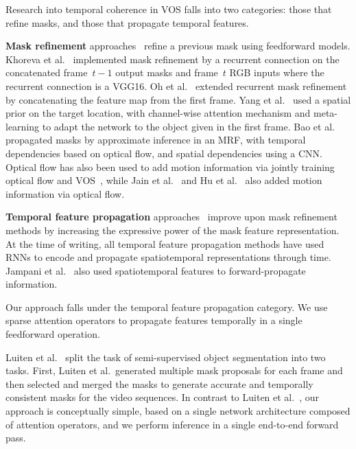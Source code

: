 Research into temporal coherence in VOS falls into two categories: those that
refine masks, and those that propagate temporal features.

\textbf{Mask refinement}
approaches~\cite{khoreva2017learning,oh2018fast,khoreva2017learning,hu2017maskrnn,jang2017online}
refine a previous mask using feedforward models.
Khoreva et al.~\cite{khoreva2017learning} implemented mask refinement by a
recurrent connection on the concatenated frame~$t-1$ output masks and frame~$t$
RGB inputs where the recurrent connection is a VGG16.
Oh et al.~\cite{oh2018fast} extended recurrent mask refinement by concatenating
the feature map from the first frame.
Yang et al.~\cite{yang2018efficient} used a spatial prior on the target
location, with channel-wise attention mechanism and meta-learning to adapt the
network to the object given in the first frame.
Bao et al.~\cite{bao2018cnn} propagated masks by approximate inference in an
MRF, with temporal dependencies based on optical flow, and spatial dependencies
using a CNN\@.
Optical flow has also been used to add motion information via jointly training
optical flow and VOS~\cite{cheng2017segflow},
while Jain et al.~\cite{jain2017fusionseg} and Hu et al.~\cite{hu2018motion}
also added motion information via optical flow.

\textbf{Temporal feature propagation}
approaches~\cite{tokmakov2017learning,xu2018youtube,hu2017maskrnn,salvador2017recurrent}
improve upon mask refinement methods by increasing the expressive power of the
mask feature representation.
At the time of writing, all temporal feature propagation methods have used RNNs
to encode and propagate spatiotemporal representations through time.
Jampani et al.~\cite{jampani2017video} also used spatiotemporal features to
forward-propagate information.

Our approach falls under the temporal feature propagation category.
We use sparse attention operators to propagate features temporally in a single
feedforward operation.



Luiten et al.~\cite{luiten2018premvos} split the task of semi-supervised object
segmentation into two tasks.
First, Luiten et al.\ generated multiple mask proposals for each frame and then
selected and merged the masks to generate accurate and temporally consistent
masks for the video sequences.
In contrast to Luiten et al.~\cite{luiten2018premvos}, our approach is
conceptually simple, based on a single network architecture composed of
attention operators, and we perform inference in a single end-to-end forward
pass.

